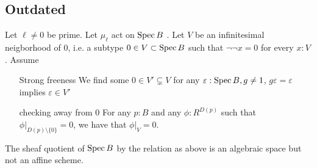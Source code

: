 \subsection{Outdated}
\begin{prop}
	Let $\ell \neq 0$ be prime. Let $\mu_\ell$ act on $\operatorname{Spec} B$ . Let $V$ be an infinitesimal neigborhood of $0$, i.e. a subtype   $0 \in V \subset \operatorname{Spec} B$ such that $\lnot \lnot x =0$ for every $x : V$. Assume
	\begin{enumerate}
		\item[Strong freeness]  We find some $0 \in V' \subsetneq V$ for any $\varepsilon : \operatorname{Spec} B, g\neq 1$, $g \varepsilon = \varepsilon$ implies $\varepsilon \in V'$

	\item[checking away from 0] For any $p : B$ and any $\phi: R^{D(p)} $ such that $\phi|_{D(p) \setminus\{0\}} = 0$, we have that $\phi|_V = 0$.
		\end{enumerate} 
	The sheaf quotient of $\operatorname{Spec} B$ by the relation as above is an algebraic space but not an affine scheme.
\end{prop}
